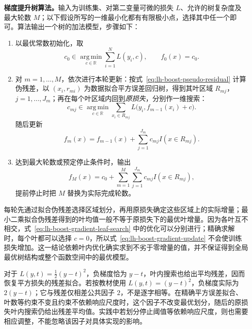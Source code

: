 \textbf{梯度提升树算法。}输入为训练集、对第二变量可微的损失 $L$、允许的树复杂度及最大轮数 $M$；以下假设所写的一维最小化都有有限极小点，选择其中任一个即可。算法输出一个树的加法模型，步骤如下：
\begin{enumerate}
 \item 以最优常数初始化，取
 \begin{equation}
  c_0\in\operatorname*{arg\,min}_{c\in\mathbb R}\sum_{i=1}^{N}L(y_i,c),\qquad
  f_0(x)=c_0.
  \label{eq:lh-boost-gradient-initial}
 \end{equation}
 \item 对 $m=1,\ldots,M$，依次进行本轮更新：按式~\eqref{eq:lh-boost-pseudo-residual} 计算伪残差，以 $(x_i,r_{mi})$ 为数据拟合平方误差回归树，得到其叶区域 $R_{mj}$，$j=1,\ldots,J_m$；再在每个叶区域内回到\emph{原损失}，分别作一维搜索：
 \begin{equation}
  c_{mj}\in\operatorname*{arg\,min}_{c\in\mathbb R}
  \sum_{x_i\in R_{mj}}L\bigl(y_i,f_{m-1}(x_i)+c\bigr).
  \label{eq:lh-boost-gradient-leaf-search}
 \end{equation}
 随后更新
 \begin{equation}
  f_m(x)=f_{m-1}(x)+\sum_{j=1}^{J_m}c_{mj}I(x\in R_{mj}).
  \label{eq:lh-boost-gradient-update}
 \end{equation}
 \item 达到最大轮数或预定停止条件时，输出
 \begin{equation}
  f_M(x)=c_0+\sum_{m=1}^{M}\sum_{j=1}^{J_m}c_{mj}I(x\in R_{mj}),
  \label{eq:lh-boost-gradient-output}
 \end{equation}
 提前停止时把 $M$ 替换为实际完成轮数。
\end{enumerate}

每轮先通过拟合伪残差选择区域划分，再用原损失确定这些区域上的实际增量；最小二乘拟合伪残差得到的叶均值一般不等于原损失下的最优叶增量。因为各叶互不相交，式~\eqref{eq:lh-boost-gradient-leaf-search} 中的优化可以分别进行；精确求解时，每个叶都可以选择 $c=0$，所以式~\eqref{eq:lh-boost-gradient-update} 不会使训练损失增加。这一结论依赖叶内优化确实求到不劣于零增量的值，并不保证得到全局最优树结构或整个函数空间中的最优模型。

对于 $L(y,t)=\tfrac12(y-t)^2$，负梯度恰为 $y-t$，叶内搜索也给出平均残差，因而恢复平方损失的残差拟合。若按教材使用 $L(y,t)=(y-t)^2$，负梯度实际为 $2(y-t)$；它与残差仅相差公共因子 $2$，不是逐字相等。在精确平方误差拟合、叶数等约束不变且约束不依赖响应尺度时，这个因子不改变最优划分，随后的原损失叶内搜索仍给出残差平均值。实践中若划分停止阈值等依赖响应尺度，则也需要相应调整，不能忽略该因子对具体实现的影响。

